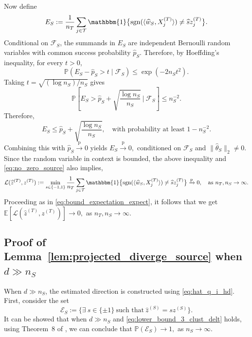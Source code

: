 \documentclass[10pt]{article}
\newcommand{\convp}{\xrightarrow{\mathrm{p}}}
\newcommand{\wh}{\widehat}
\newcommand{\calL}{\mathcal L}
\newcommand{\calT}{\mathcal T}
\newcommand{\trg}{T}
\newcommand{\nT}{n_{\trg}}
\newcommand{\Xtar}{X^{(\trg)}}
\newcommand{\ztar}{z^{(\trg)}}
\newcommand{\hatztar}{\wh{z}^{(\trg)}}
\newcommand{\src}{S}
\newcommand{\nS}{n_{\src}}
\newcommand{\zsrc}{z^{(\src)}}
\begin{document}
Now define
\[
E_\src:=\frac{1}{\nT}\sum_{j\in \calT}\mathbbm{1}\bigl\{\operatorname{sgn}(\langle\wh w_\src, \Xtar_j\rangle)\ne \wh s \ztar_j\bigr\}.
\]
Conditional on $\mathcal F_\src$, the summands in $E_\src$ are independent Bernoulli random variables with common success probability $\wh p_\src$. Therefore, by Hoeffding's inequality, for every $t>0$,
\[
\mathbb P\left(E_\src-\wh p_\src>t\mid \mathcal F_\src\right)\le \exp(-2\nS t^2).
\]
Taking $t=\sqrt{(\log \nS)/\nS}$ gives
\[
\mathbb P\left[E_\src>\wh p_\src+\sqrt{\frac{\log \nS}{\nS}}~\Big|~\mathcal F_\src\right]\le \nS^{-2}.
\]
Therefore,
\[
E_\src\le \wh p_\src+\sqrt{\frac{\log \nS}{\nS}}, \quad \mbox{with probability at least $1-\nS^{-2}$.}
\]
Combining this with $\wh p_\src\convp 0$ yields $E_\src\convp0,$ conditioned on $\mathcal F_\src$ and $\|\wh \theta_\src\|_2 \neq 0$. Since the random variable in context is bounded, the above inequality and \eqref{eq:no_zero_source} also implies, 
\begin{align}
    \calL(\hatztar,\ztar):=\min_{s\in\{-1,1\}}\frac{1}{\nT}\sum_{j\in \calT}\mathbbm{1}\bigl\{\operatorname{sgn}(\langle\wh w_\src, \Xtar_j\rangle)\ne \wh s \ztar_j\bigr\} \convp 0, \quad \mbox{as $\nT,\nS \to \infty$.}
\end{align}
Proceeding as in \eqref{eq:bound_expectation_expect}, it follows that we get $\mathbb E\left[\calL\left(\hatztar,\ztar\right)\right] \to 0,$ as $\nT,\nS \to \infty$.

\subsection{Proof of Lemma~\ref{lem:projected_diverge_source} when $d \gg \nS$}
\label{sec:proof_s_6_d_gg_n}
When $d \gg \nS$, the estimated direction is constructed using \eqref{eq:hat_q_i_hd}. First, consider the set
\[
\mathcal E_\src:=\{\exists~s\in \{\pm 1\}~\text{such that}~\wh z^{(\src)}=s\zsrc\}.
\]
It can be showed that when $d \gg \nS$ and \eqref{eq:lower_bound_3_clust_delt} holds, using Theorem~8 of \citet{Ndaoud2022}, we can conclude that $\mathbb P(\mathcal E_\src) \to 1,$ as $\nS \to \infty$. 
\end{document}
